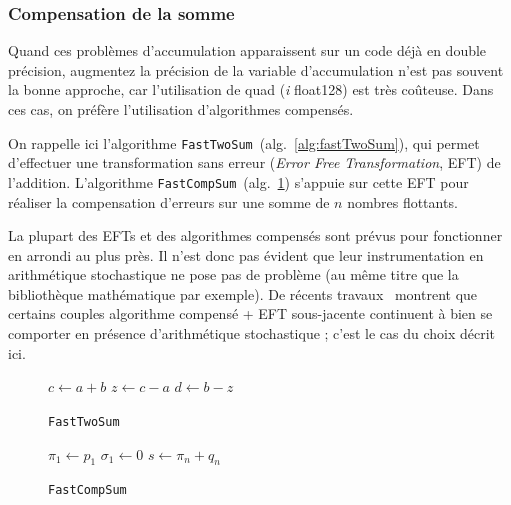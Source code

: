 \documentclass[a4paper]{article}
\newenvironment{info}[1][NB :]{
  \begin{mdframed}[style=info]
    \noindent{\bf #1}
}{
  \end{mdframed}
}
\begin{document}
\subsubsection{Compensation de la somme}
\label{sec:fix.sum}
Quand ces problèmes d'accumulation apparaissent sur un code déjà en double
précision, augmentez la précision de la variable d'accumulation n'est
pas souvent la bonne approche, car l'utilisation de quad (\textit{i} float128) est très
coûteuse. Dans ces cas, on préfère l'utilisation d'algorithmes
compensés.


On rappelle ici l'algorithme \texttt{FastTwoSum}~(alg.~\ref{alg:fastTwoSum}),
qui permet d'effectuer une transformation sans erreur (\textit{Error Free
  Transformation}, EFT) de l'addition. L'algorithme
\texttt{FastCompSum}~(alg.~\ref{alg:fastCompSum}) s'appuie sur cette EFT pour
réaliser la compensation d'erreurs sur une somme de $n$ nombres flottants.

\begin{info}
  La plupart des EFTs et des algorithmes compensés sont prévus pour fonctionner
  en arrondi au plus près. Il n'est donc pas évident que leur instrumentation en
  arithmétique stochastique ne pose pas de problème (au même titre que la
  bibliothèque mathématique par exemple). De récents travaux~\cite{graillat2018}
  montrent que certains couples algorithme compensé + EFT sous-jacente
  continuent à bien se comporter en présence d'arithmétique stochastique ; c'est
  le cas du choix décrit ici.
\end{info}

\begin{figure}[htbp]
\strut\hfill
\begin{minipage}[t]{0.4\linewidth}
  \vspace{0pt}
  \begin{algorithm}[H]
    \medskip
    $c \leftarrow a + b$ \;
    $z \leftarrow c - a$ \;
    $d \leftarrow b - z$ \;
    \caption{\tt FastTwoSum}\label{alg:fastTwoSum}
  \end{algorithm}
\end{minipage}
\hfill%
\begin{minipage}[t]{0.4\linewidth}
  \vspace{0pt}
  \begin{algorithm}[H]
    \smallskip
    \medskip
    $\pi_1 \leftarrow p_1$ \;
    $\sigma_1 \leftarrow 0$ \;
    $s \leftarrow \pi_n + q_n$ \;
    \caption{\tt FastCompSum}\label{alg:fastCompSum}
  \end{algorithm}
\end{minipage}
\hfill\strut
\end{figure}
\end{document}
